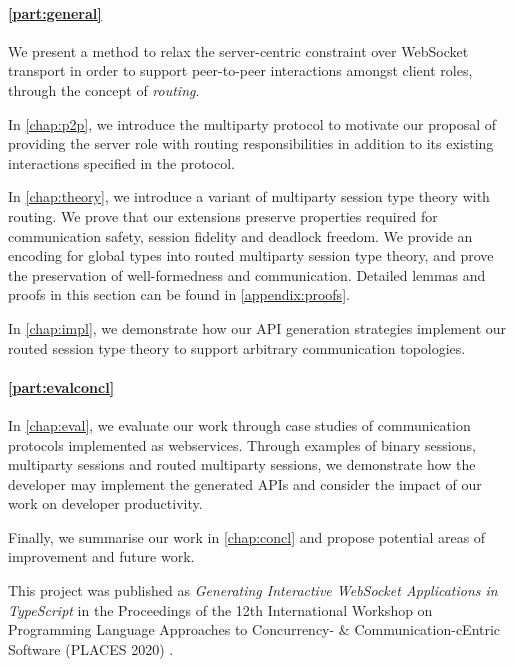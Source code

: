 \paragraph{\cref{part:general}} 
We present a method to relax the server-centric constraint over WebSocket
transport in order to support peer-to-peer interactions amongst 
client roles, through the concept of \emph{routing}.

In \cref{chap:p2p}, we introduce the  multiparty
protocol to motivate our proposal of providing the server role with 
routing responsibilities in addition to its existing interactions
specified in the protocol.

In \cref{chap:theory}, we introduce a variant of multiparty 
session type theory with routing. We prove that our extensions preserve 
properties required for communication safety, 
session fidelity and deadlock freedom.
We provide an encoding for global types into routed multiparty 
session type theory, and prove the preservation of well-formedness
and communication. Detailed lemmas and proofs in this section can
be found in \cref{appendix:proofs}.

In \cref{chap:impl}, we demonstrate how our API generation strategies
implement our routed session type theory to support arbitrary communication
topologies.

\paragraph{\cref{part:evalconcl}}
In \cref{chap:eval}, we evaluate our work through 
case studies of communication protocols 
implemented as webservices. Through examples of binary sessions,
multiparty sessions and routed multiparty sessions, we demonstrate how the
developer may implement the generated APIs and consider the impact of our work
on developer productivity.

Finally, we summarise our work in \cref{chap:concl} and propose potential
areas of improvement and future work.

This project was published as \emph{Generating Interactive WebSocket 
Applications in TypeScript} in the Proceedings of the 
12th International Workshop on Programming Language Approaches to 
Concurrency- \& Communication-cEntric Software (PLACES 2020) 
\cite{PLACES2020}.
